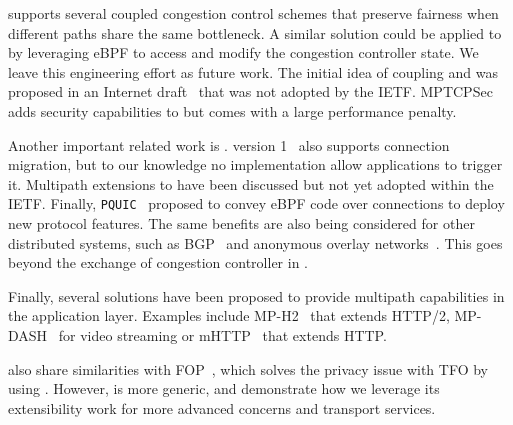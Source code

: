 \mptcp \cite{raiciu2012hard,rfc6824} supports several coupled congestion
control schemes \cite{peng2014multipath,wischik2011design,khalili2013mptcp} 
that preserve fairness when different paths share the same bottleneck. A 
similar solution  could be applied to \tcpls by leveraging eBPF to access and 
modify the  congestion controller state. We leave this engineering effort as 
future work. The initial idea of coupling \mptcp and \tls was proposed in an
Internet draft~\cite{draft-paasch-mptcp-ssl-00} that was not adopted by the
IETF. MPTCPSec~\cite{jadin2017securing} adds security capabilities to \mptcp but
comes with a large performance penalty.

Another important related work is \quic. %
\quic version 1~\cite{rfc9000} also supports connection migration, but to our knowledge no implementation allow applications to trigger  it. %
Multipath extensions
\cite{viernickel2018multipath,de2017multipath,draft-liu-multipath-quic-02}
to \quic have been discussed but not yet adopted within the IETF. Finally,
\texttt{PQUIC}~\cite{de2019pluginizing} proposed to convey eBPF code over \quic
connections to deploy new protocol features. The same benefits are also being 
considered for other distributed systems, such as BGP~\cite{xBGP} and
anonymous overlay networks~\cite{fan-hotpets}. This goes beyond the exchange of
congestion controller in \tcpls.

Finally, several solutions have been proposed to provide multipath capabilities
in the application layer. Examples include MP-H2~\cite{nikravesh2019mp} that
extends HTTP/2, MP-DASH~\cite{han2016mp} for video streaming or mHTTP~\cite{kim2014multi} that extends HTTP.

\tcpls also share similarities with \tls FOP~\cite{sy2020enhanced}, which
solves the privacy issue with TFO by using \tls. However, \tcpls is more generic, and demonstrate how we leverage its extensibility work for more advanced  concerns and transport services.


